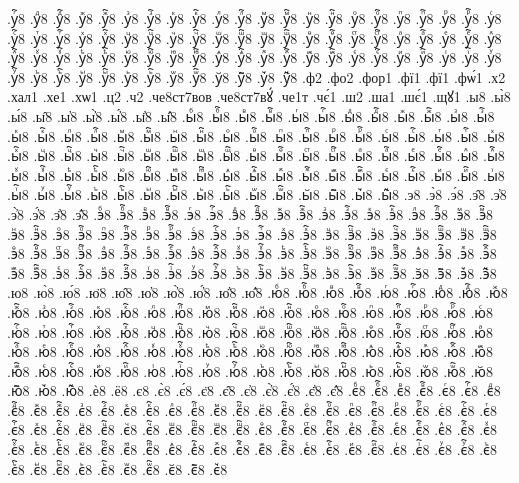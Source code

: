 {.уⷢ҇8
.уⷣ8
.уⷣ҇8
.уⷤ8
.уⷤ҇8
.уⷥ8
.уⷥ҇8
.уⷦ8
.уⷦ҇8
.уⷧ8
.уⷧ҇8
.уⷨ8
.уⷨ҇8
.уⷩ8
.уⷩ҇8
.уⷪ8
.уⷪ҇8
.уⷫ8
.уⷫ҇8
.уⷬ8
.уⷬ҇8
.уⷭ8
.уⷭ҇8
.уⷮ8
.уⷮ҇8
.уⷯ8
.уⷯ҇8
.уⷰ8
.уⷰ҇8
.уⷱ8
.уⷱ҇8
.уⷲ8
.уⷲ҇8
.уⷳ8
.уⷳ҇8
.уⷴ8
.уⷴ҇8
.уⷵ8
.уⷵ҇8
.уⷶ8
.уⷶ҇8
.уⷷ8
.уⷷ҇8
.уⷸ8
.уⷸ҇8
.уⷹ8
.уⷹ҇8
.уⷺ8
.уⷺ҇8
.уⷻ8
.уⷻ҇8
.уⷼ8
.уⷼ҇8
.уⷽ8
.уⷽ҇8
.уⷾ8
.уⷾ҇8
.уⷿ8
.уⷿ҇8
.уꙴ8
.уꙴ҇8
.уꙵ8
.уꙵ҇8
.уꙶ8
.уꙶ҇8
.уꙷ8
.уꙷ҇8
.уꙸ8
.уꙸ҇8
.уꙹ8
.уꙹ҇8
.уꙺ8
.уꙺ҇8
.уꙻ8
.уꙻ҇8
.у꙼8
.у꙼҇8
.у꙽8
.у꙽҇8
.ф2
.фо2
.фор1
.фї1
.фї1
.фѡ́1
.х2
.хал1
.хе1
.хѡ1
.ц2
.ч2
.че8ст7вов
.че8ст7вꙋ́
.че1т
.чє́1
.ш2
.ша1
.шє́1
.щꙋ1
.ы8
.ы̀8
.ы́8
.ы̑8
.ы҆8
.ы҆̀8
.ы҆́8
.ы҆̈8
.ы҆̑8
.ыⷠ8
.ыⷠ҇8
.ыⷡ8
.ыⷡ҇8
.ыⷢ8
.ыⷢ҇8
.ыⷣ8
.ыⷣ҇8
.ыⷤ8
.ыⷤ҇8
.ыⷥ8
.ыⷥ҇8
.ыⷦ8
.ыⷦ҇8
.ыⷧ8
.ыⷧ҇8
.ыⷨ8
.ыⷨ҇8
.ыⷩ8
.ыⷩ҇8
.ыⷪ8
.ыⷪ҇8
.ыⷫ8
.ыⷫ҇8
.ыⷬ8
.ыⷬ҇8
.ыⷭ8
.ыⷭ҇8
.ыⷮ8
.ыⷮ҇8
.ыⷯ8
.ыⷯ҇8
.ыⷰ8
.ыⷰ҇8
.ыⷱ8
.ыⷱ҇8
.ыⷲ8
.ыⷲ҇8
.ыⷳ8
.ыⷳ҇8
.ыⷴ8
.ыⷴ҇8
.ыⷵ8
.ыⷵ҇8
.ыⷶ8
.ыⷶ҇8
.ыⷷ8
.ыⷷ҇8
.ыⷸ8
.ыⷸ҇8
.ыⷹ8
.ыⷹ҇8
.ыⷺ8
.ыⷺ҇8
.ыⷻ8
.ыⷻ҇8
.ыⷼ8
.ыⷼ҇8
.ыⷽ8
.ыⷽ҇8
.ыⷾ8
.ыⷾ҇8
.ыⷿ8
.ыⷿ҇8
.ыꙴ8
.ыꙴ҇8
.ыꙵ8
.ыꙵ҇8
.ыꙶ8
.ыꙶ҇8
.ыꙷ8
.ыꙷ҇8
.ыꙸ8
.ыꙸ҇8
.ыꙹ8
.ыꙹ҇8
.ыꙺ8
.ыꙺ҇8
.ыꙻ8
.ыꙻ҇8
.ы꙼8
.ы꙼҇8
.ы꙽8
.ы꙽҇8
.э8
.э̀8
.э́8
.э̑8
.э҆8
.э҆̀8
.э҆́8
.э҆̈8
.э҆̑8
.эⷠ8
.эⷠ҇8
.эⷡ8
.эⷡ҇8
.эⷢ8
.эⷢ҇8
.эⷣ8
.эⷣ҇8
.эⷤ8
.эⷤ҇8
.эⷥ8
.эⷥ҇8
.эⷦ8
.эⷦ҇8
.эⷧ8
.эⷧ҇8
.эⷨ8
.эⷨ҇8
.эⷩ8
.эⷩ҇8
.эⷪ8
.эⷪ҇8
.эⷫ8
.эⷫ҇8
.эⷬ8
.эⷬ҇8
.эⷭ8
.эⷭ҇8
.эⷮ8
.эⷮ҇8
.эⷯ8
.эⷯ҇8
.эⷰ8
.эⷰ҇8
.эⷱ8
.эⷱ҇8
.эⷲ8
.эⷲ҇8
.эⷳ8
.эⷳ҇8
.эⷴ8
.эⷴ҇8
.эⷵ8
.эⷵ҇8
.эⷶ8
.эⷶ҇8
.эⷷ8
.эⷷ҇8
.эⷸ8
.эⷸ҇8
.эⷹ8
.эⷹ҇8
.эⷺ8
.эⷺ҇8
.эⷻ8
.эⷻ҇8
.эⷼ8
.эⷼ҇8
.эⷽ8
.эⷽ҇8
.эⷾ8
.эⷾ҇8
.эⷿ8
.эⷿ҇8
.эꙴ8
.эꙴ҇8
.эꙵ8
.эꙵ҇8
.эꙶ8
.эꙶ҇8
.эꙷ8
.эꙷ҇8
.эꙸ8
.эꙸ҇8
.эꙹ8
.эꙹ҇8
.эꙺ8
.эꙺ҇8
.эꙻ8
.эꙻ҇8
.э꙼8
.э꙼҇8
.э꙽8
.э꙽҇8
.ю8
.ю̀8
.ю́8
.ю̈8
.ю̑8
.ю҆8
.ю҆̀8
.ю҆́8
.ю҆̈8
.ю҆̑8
.юⷠ8
.юⷠ҇8
.юⷡ8
.юⷡ҇8
.юⷢ8
.юⷢ҇8
.юⷣ8
.юⷣ҇8
.юⷤ8
.юⷤ҇8
.юⷥ8
.юⷥ҇8
.юⷦ8
.юⷦ҇8
.юⷧ8
.юⷧ҇8
.юⷨ8
.юⷨ҇8
.юⷩ8
.юⷩ҇8
.юⷪ8
.юⷪ҇8
.юⷫ8
.юⷫ҇8
.юⷬ8
.юⷬ҇8
.юⷭ8
.юⷭ҇8
.юⷮ8
.юⷮ҇8
.юⷯ8
.юⷯ҇8
.юⷰ8
.юⷰ҇8
.юⷱ8
.юⷱ҇8
.юⷲ8
.юⷲ҇8
.юⷳ8
.юⷳ҇8
.юⷴ8
.юⷴ҇8
.юⷵ8
.юⷵ҇8
.юⷶ8
.юⷶ҇8
.юⷷ8
.юⷷ҇8
.юⷸ8
.юⷸ҇8
.юⷹ8
.юⷹ҇8
.юⷺ8
.юⷺ҇8
.юⷻ8
.юⷻ҇8
.юⷼ8
.юⷼ҇8
.юⷽ8
.юⷽ҇8
.юⷾ8
.юⷾ҇8
.юⷿ8
.юⷿ҇8
.юꙴ8
.юꙴ҇8
.юꙵ8
.юꙵ҇8
.юꙶ8
.юꙶ҇8
.юꙷ8
.юꙷ҇8
.юꙸ8
.юꙸ҇8
.юꙹ8
.юꙹ҇8
.юꙺ8
.юꙺ҇8
.юꙻ8
.юꙻ҇8
.ю꙼8
.ю꙼҇8
.ю꙽8
.ю꙽҇8
.ѐ8
.ё8
.є8
.є̀8
.є́8
.є̈8
.є̑8
.є҆8
.є҆̀8
.є҆́8
.є҆̈8
.є҆̑8
.єⷠ8
.єⷠ҇8
.єⷡ8
.єⷡ҇8
.єⷢ8
.єⷢ҇8
.єⷣ8
.єⷣ҇8
.єⷤ8
.єⷤ҇8
.єⷥ8
.єⷥ҇8
.єⷦ8
.єⷦ҇8
.єⷧ8
.єⷧ҇8
.єⷨ8
.єⷨ҇8
.єⷩ8
.єⷩ҇8
.єⷪ8
.єⷪ҇8
.єⷫ8
.єⷫ҇8
.єⷬ8
.єⷬ҇8
.єⷭ8
.єⷭ҇8
.єⷮ8
.єⷮ҇8
.єⷯ8
.єⷯ҇8
.єⷰ8
.єⷰ҇8
.єⷱ8
.єⷱ҇8
.єⷲ8
.єⷲ҇8
.єⷳ8
.єⷳ҇8
.єⷴ8
.єⷴ҇8
.єⷵ8
.єⷵ҇8
.єⷶ8
.єⷶ҇8
.єⷷ8
.єⷷ҇8
.єⷸ8
.єⷸ҇8
.єⷹ8
.єⷹ҇8
.єⷺ8
.єⷺ҇8
.єⷻ8
.єⷻ҇8
.єⷼ8
.єⷼ҇8
.єⷽ8
.єⷽ҇8
.єⷾ8
.єⷾ҇8
.єⷿ8
.єⷿ҇8
.єꙴ8
.єꙴ҇8
.єꙵ8
.єꙵ҇8
.єꙶ8
.єꙶ҇8
.єꙷ8
.єꙷ҇8
.єꙸ8
.єꙸ҇8
.єꙹ8
.єꙹ҇8
.єꙺ8
.єꙺ҇8
.єꙻ8
.єꙻ҇8
.є꙼8
.є꙼҇8
.є꙽8
}
